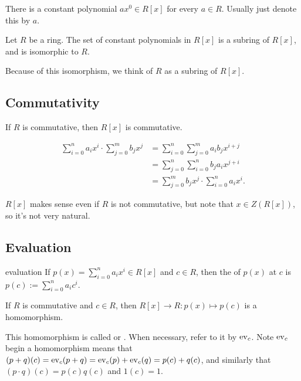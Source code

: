 \documentclass[12pt,letterpaper]{report}
\begin{document}
There is a constant polynomial $ax^0 \in R[x]$ for every $a \in R$.
Usually just denote this by $a$.

\begin{lem}{}{}
  Let $R$ be a ring.
  The set of constant polynomials in $R[x]$ is a subring of $R[x]$, and is isomorphic to $R$.
\end{lem}

Because of this isomorphism, we think of $R$ as a subring of $R[x]$.

\pagebreak
\subsection{Commutativity}

\begin{lem}{}{}
  If $R$ is commutative, then $R[x]$ is commutative.
\end{lem}

\begin{thmproof}
  \begin{align*}
    \sum_{i = 0}^n a_i x^i \cdot \sum_{j = 0}^m b_j x^j
    &= \sum_{i = 0}^n \sum_{j = 0}^m a_i b_j x^{i + j} \\
    &= \sum_{j = 0}^n \sum_{i = 0}^n b_j a_i x^{j + i} \\
    &= \sum_{j = 0}^m b_j x^j \cdot \sum_{i = 0}^n a_i x^i.
  \end{align*}
\end{thmproof}

$R[x]$ makes sense even if $R$ is not commutative, but note that $x \in Z(R[x])$, so it's not very
natural.

\pagebreak
\subsection{Evaluation}

\begin{defn}{evaluation}{}
  If $p(x) = \sum_{i = 0}^n a_i x^i \in R[x]$ and $c \in R$, then the  of $p(x)$
  at $c$ is $p(c) := \sum_{i = 0}^n a_i c^i$.
\end{defn}

\begin{prop}{}{}
  If $R$ is commutative and $c \in R$, then $R[x] \to R : p(x) \mapsto p(c)$ is a homomorphism.
\end{prop}

This homomorphism is called  or .
When necessary, refer to it by $\operatorname{ev}_c$.
Note $\operatorname{ev}_c$ begin a homomorphism means that
$(p + q)(c) = \operatorname{ev}_c(p + q) = \operatorname{ev}_c(p) + \operatorname{ev}_c(q) = p(c) + q(c)$, and similarly that
$(p \cdot q)(c) = p(c)q(c)$ and $1(c) = 1$.
\end{document}
